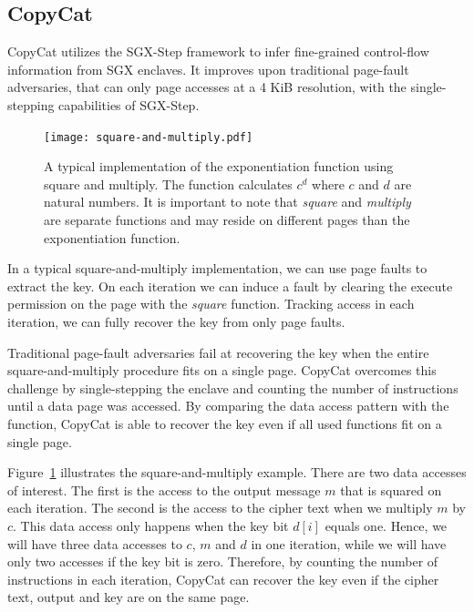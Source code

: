\documentclass{llncs}
\begin{document}
\subsection{CopyCat}

CopyCat \cite{MoghimiBHPS20} utilizes the SGX-Step framework
to infer fine-grained control-flow information from SGX enclaves.
It improves upon traditional page-fault adversaries,
that can only page accesses at a 4 KiB resolution,
with the single-stepping capabilities of SGX-Step.

\begin{figure}[t]
  \centering
  \texttt{[image: square-and-multiply.pdf]}
  \caption{A typical implementation of the exponentiation function using square and multiply.
    The function calculates $c^d$ where $c$ and $d$ are natural numbers.
    It is important to note that \emph{square} and \emph{multiply} are separate functions
    and may reside on different pages than the exponentiation function.}
  \label{fig:square-and-multiply}
\end{figure}

In a typical square-and-multiply implementation,
we can use page faults to extract the key.
On each iteration we can induce a fault by clearing the execute permission on
the page with the \emph{square} function.
Tracking access in each iteration, we can fully recover the key from only page faults.

Traditional page-fault adversaries fail at recovering the key when the entire
square-and-multiply procedure fits on a single page.
CopyCat overcomes this challenge by single-stepping the enclave and counting the
number of instructions until a data page was accessed.
By comparing the data access pattern with the function, CopyCat is able to recover the key
even if all used functions fit on a single page.

Figure~\ref{fig:square-and-multiply} illustrates the square-and-multiply example.
There are two data accesses of interest.
The first is the access to the output message $m$ that is squared on each iteration.
The second is the access to the cipher text when we multiply $m$ by $c$.
This data access only happens when the key bit $d[i]$ equals one.
Hence, we will have three data accesses to $c$, $m$ and $d$ in one iteration,
while we will have only two accesses if the key bit is zero.
Therefore, by counting the number of instructions in each iteration,
CopyCat can recover the key even if the cipher text, output and key are on the same page.

\end{document}
